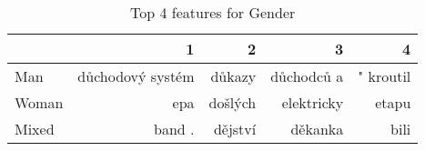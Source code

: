 \begin{table}
\centering
\caption{Top 4 features for Gender}
\label{tab:top4_authors_cum_gender}
\begin{tabular}{lrrrr}
\toprule
{} &                 1 &        2 &           3 &          4 \\
\midrule
Man   &  důchodový systém &   důkazy &  důchodců a &  " kroutil \\
Woman &               epa &  došlých &  elektricky &      etapu \\
Mixed &            band . &  dějství &     děkanka &       bili \\
\bottomrule
\end{tabular}
\end{table}
